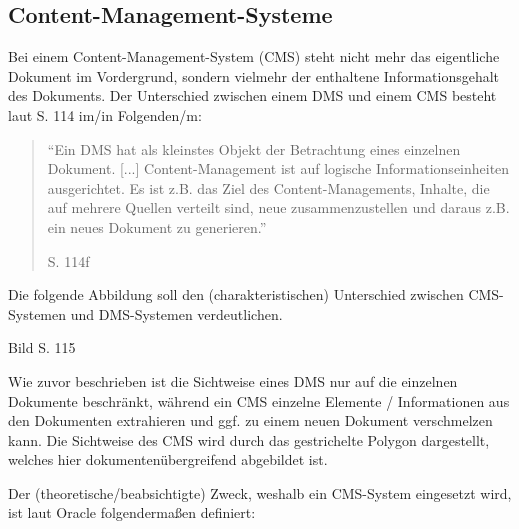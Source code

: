 \subsection{Content-Management-Systeme}
Bei einem Content-Management-System (\gls{CMS})  steht nicht mehr das eigentliche Dokument im Vordergrund, sondern vielmehr der enthaltene Informationsgehalt des Dokuments.
Der Unterschied zwischen einem \gls{DMS} und einem \gls{CMS} besteht laut \cite{DMS08} S. 114 im/in Folgenden/m:


\begin{quote}"`Ein \gls{DMS} hat als kleinstes Objekt der Betrachtung eines einzelnen Dokument. [...] Content-Management ist auf logische Informationseinheiten ausgerichtet. Es ist z.B. das Ziel des Content-Managements, Inhalte, die auf mehrere Quellen verteilt sind, neue zusammenzustellen und daraus z.B. ein neues Dokument zu generieren."'
\begin{flushright}\cite{DMS08} S. 114f\end{flushright}\end{quote}

Die folgende Abbildung soll den (charakteristischen) Unterschied zwischen \gls{CMS}-Systemen und \gls{DMS}-Systemen verdeutlichen.

\begin{center}
Bild \cite{DMS08} S. 115
\end{center}

Wie zuvor beschrieben ist die Sichtweise eines \gls{DMS} nur auf die einzelnen Dokumente beschränkt, während ein \gls{CMS} einzelne Elemente / Informationen aus den Dokumenten extrahieren und ggf. zu einem neuen Dokument verschmelzen kann. Die Sichtweise des \gls{CMS} wird durch das gestrichelte Polygon dargestellt, welches hier dokumentenübergreifend abgebildet ist.

Der (theoretische/beabsichtigte) Zweck, weshalb ein \gls{CMS}-System eingesetzt wird, ist laut Oracle folgendermaßen definiert:

